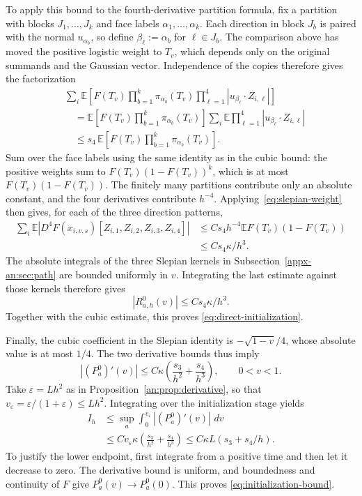 \documentclass[11pt,letterpaper,twoside,leqno]{article}
\theoremstyle{bookplain}
\theoremstyle{bookremark}
\newcommand{\E}{\mathbb E}
\newcommand{\dd}{\,d}
\begin{document}
To apply this bound to the fourth-derivative partition formula,
fix a partition with blocks $J_1,\ldots,J_k$ and face labels
$\alpha_1,\ldots,\alpha_k$. Each direction in block $J_b$ is paired
with the normal $u_{\alpha_b}$, so define
$\beta_\ell:=\alpha_b$ for $\ell\in J_b$.
The comparison above has moved the positive logistic weight to
$T_v$, which depends only on the original summands and the Gaussian
vector. Independence of the copies therefore gives the factorization
\[
 \begin{aligned}
 &\sum_i\E\!\left[
   F(T_v)\prod_{b=1}^k\pi_{\alpha_b}(T_v)
   \prod_{\ell=1}^4|u_{\beta_\ell}\cdot Z_{i,\ell}|\right]\\
 &\quad=\E\!\left[F(T_v)\prod_{b=1}^k\pi_{\alpha_b}(T_v)\right]
       \sum_i\E\prod_{\ell=1}^4|u_{\beta_\ell}\cdot Z_{i,\ell}|\\
 &\quad\le s_4\,\E\!\left[
       F(T_v)\prod_{b=1}^k\pi_{\alpha_b}(T_v)\right].
 \end{aligned}
\]
Sum over the face labels using the same identity as in the cubic
bound: the positive weights sum to $F(T_v)(1-F(T_v))^k$,
which is at most $F(T_v)(1-F(T_v))$. The finitely many partitions
contribute only an absolute constant, and the four derivatives
contribute $h^{-4}$. Applying~\eqref{eq:slepian-weight} then gives,
for each of the three direction patterns,
\[
 \begin{aligned}
 \sum_i\E\left|
   D^4F(x_{i,v,s})[Z_{i,1},Z_{i,2},Z_{i,3},Z_{i,4}]
          \right|
 &\le Cs_4h^{-4}\E F(T_v)(1-F(T_v))\\
 &\le Cs_4\kappa/h^3.
 \end{aligned}
\]
The absolute integrals of the three Slepian kernels in
Subsection~\ref{appx-an:sec:path} are bounded uniformly in \(v\).
Integrating the last estimate against those kernels therefore gives
\[
 |R^0_{a,h}(v)|\le Cs_4\kappa/h^3.
\]
Together with the cubic estimate, this proves
\eqref{eq:direct-initialization}.

Finally, the cubic coefficient in the Slepian identity is
\(-\sqrt{1-v}/4\), whose absolute value is at most \(1/4\).
The two derivative bounds thus imply
\[
 |(P_a^0)'(v)|
 \le C\kappa\left(\frac{s_3}{h^2}+\frac{s_4}{h^3}\right),
 \qquad 0<v<1.
\]
Take \(\varepsilon=Lh^2\) as in
Proposition~\ref{an:prop:derivative}, so that
\(v_\varepsilon=\varepsilon/(1+\varepsilon)\le Lh^2\).
Integrating over the initialization stage yields
\[
 \begin{aligned}
 I_h&\le\sup_a\int_0^{v_\varepsilon}|(P_a^0)'(v)|\,\dd v\\
 &\le C v_\varepsilon\kappa
       \left(\frac{s_3}{h^2}+\frac{s_4}{h^3}\right)
 \le C\kappa L(s_3+s_4/h).
 \end{aligned}
\]
To justify the lower endpoint, first integrate from a positive
time and then let it decrease to zero. The derivative bound is
uniform, and boundedness and continuity of \(F\) give
\(P_a^0(v)\to P_a^0(0)\). This proves
\eqref{eq:initialization-bound}.
\end{document}
